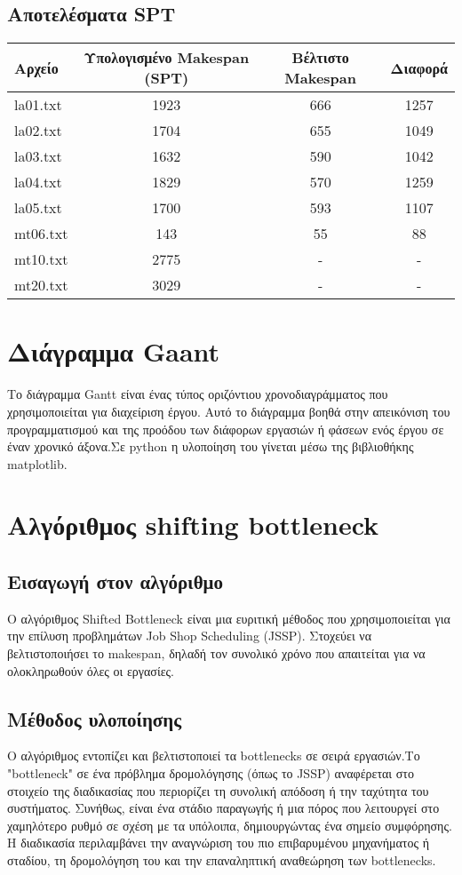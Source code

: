 \documentclass{article}
\begin{document}
\subsection{Αποτελέσματα SPT}

\begin{tabular}{ l c c c }
\hline
Αρχείο & Υπολογισμένο Makespan (SPT) & Βέλτιστο Makespan & Διαφορά \\
\hline
la01.txt & 1923 & 666 & 1257 \\
la02.txt & 1704 & 655 & 1049 \\
la03.txt & 1632 & 590 & 1042 \\
la04.txt & 1829 & 570 & 1259 \\
la05.txt & 1700 & 593 & 1107 \\
mt06.txt & 143 & 55 & 88 \\
mt10.txt & 2775 & - & - \\
mt20.txt & 3029 & - & - \\
\hline
\end{tabular}



\section{Διάγραμμα Gaant}

Το διάγραμμα Gantt είναι ένας τύπος οριζόντιου χρονοδιαγράμματος που χρησιμοποιείται για διαχείριση έργου. Αυτό το διάγραμμα βοηθά στην απεικόνιση του προγραμματισμού και της προόδου των διάφορων εργασιών ή φάσεων ενός έργου σε έναν χρονικό άξονα.Σε python η υλοποίηση του γίνεται μέσω της βιβλιοθήκης matplotlib.



\section{Αλγόριθμος shifting bottleneck}
\vspace{0.2cm}

\subsection{Εισαγωγή στον αλγόριθμο}
Ο αλγόριθμος Shifted Bottleneck είναι μια ευριτική μέθοδος που χρησιμοποιείται για την επίλυση προβλημάτων Job Shop Scheduling (JSSP). Στοχεύει να βελτιστοποιήσει το makespan, δηλαδή τον συνολικό χρόνο που απαιτείται για να ολοκληρωθούν όλες οι εργασίες.

\subsection{Μέθοδος υλοποίησης}
Ο αλγόριθμος εντοπίζει και βελτιστοποιεί τα bottlenecks σε σειρά εργασιών.Το "bottleneck" σε ένα πρόβλημα δρομολόγησης (όπως το JSSP) αναφέρεται στο στοιχείο της διαδικασίας που περιορίζει τη συνολική απόδοση ή την ταχύτητα του συστήματος. Συνήθως, είναι ένα στάδιο παραγωγής ή μια πόρος που λειτουργεί στο χαμηλότερο ρυθμό σε σχέση με τα υπόλοιπα, δημιουργώντας ένα σημείο συμφόρησης. Η διαδικασία περιλαμβάνει την αναγνώριση του πιο επιβαρυμένου μηχανήματος ή σταδίου, τη δρομολόγηση του και την επαναληπτική αναθεώρηση των bottlenecks.
\end{document}
